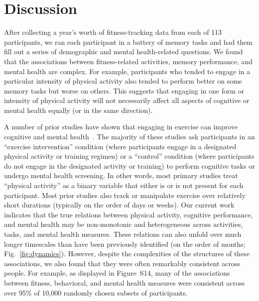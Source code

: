 \documentclass[10pt]{article}
\newcommand{\allCorr}{S14}
\begin{document}
\section*{Discussion}
After collecting a year's worth of fitness-tracking data from each of 113
participants, we ran each participant in a battery of memory tasks and
had them fill out a series of demographic and mental health-related
questions.  We found that the associations between fitness-related
activities, memory performance, and mental health are complex.  For example,
participants who tended to engage in a particular intensity of physical activity
also tended to perform better on some memory tasks but worse on others.  This
suggests that engaging in one form or intensity of physical activity
will not necessarily affect all aspects of cognitive or mental health equally
(or in the same direction).

A number of prior studies have shown that engaging in exercise can improve cognitive
and mental health~\citep{ChanEtal12b, BrisEtal02, EtniEtal06, BassSuzu17, Ragl90, MikkEtal17, TaylEtal85, DeslEtal09, Call04,
PaluSchw00, MorrEtal18, GordEtal17, MorrEtal22, HerrEtal10}.  The majority of these studies
ask participants in an ``exercise intervention'' condition (where participants engage in
a designated physical activity or training regimen) or a ``control'' condition (where participants 
do not engage in the designated activity or training) to perform cognitive tasks or undergo
mental health screening.  In other words, most primary studies treat ``physical activity'' as a binary
variable that either is or is not present for each participant.  Most prior studies also 
track or manipulate exercise over relatively short durations (typically on the order of days or weeks).  Our current work indicates
that the true relations between physical activity, cognitive performance, and mental health
may be non-monotonic and heterogeneous across activities, tasks, and mental health measures.  These
relations can also unfold over much longer timescales than have been previously identified (on the order of months; Fig.~\ref{fig:dynamics}).
However, despite the complexities of the structures of these associations, we also found that 
they were often remarkably consistent across people.  For example, as displayed in Figure~\allCorr,
many of the associations between fitness, behavioral, and mental health
measures were consistent across over 95\% of 10,000 randomly chosen subsets
of participants.
\end{document}
